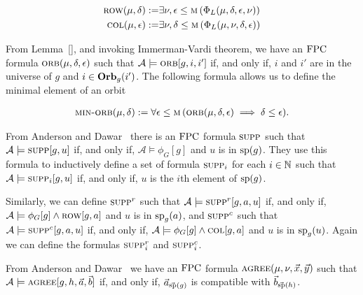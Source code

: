 \documentclass[../paper.tex]{subfiles}
\begin{document}
\begin{align*}
	\textsc{row} (\mu, \delta) :=   & \exists \nu, \epsilon \leq \textsc{m} \, (\Phi_L (\mu, \delta, \epsilon, \nu)) \\
	\textsc{col} (\mu, \epsilon) := & \exists \nu, \delta \leq \textsc{m} \, (\Phi_L (\mu, \nu, \delta , \epsilon))  
\end{align*}

From Lemma~\ref{}, and invoking Immerman-Vardi theorem, we have an $\text{\upshape FPC}$
formula $\textsc{orb}(\mu, \delta, \epsilon)$ such that $\mathcal{A} \models
\textsc{orb}[g,i, i']$ if, and only if, $i$ and $i'$ are in the universe of $g$ and
$i \in \text{\textbf{Orb}}_g(i')$. The following formula allows us to define the minimal
element of an orbit

\begin{align*}
	\textsc{min-orb} (\mu, \delta) := \forall \epsilon \leq \textsc{m} \, (\textsc{orb} (\mu, \delta, \epsilon) \implies \delta \leq \epsilon). 
\end{align*}


From Anderson and Dawar~\cite{AndersonD17} there is an $\text{\upshape FPC}$ formula
$\textsc{supp}$ such that $\mathcal{A} \models \textsc{supp} [g, u]$ if, and only if,
$\mathcal{A} \models \phi_G [g]$ and $u$ is in $\text{sp}(g)$. They use this
formula to inductively define a set of formula $\textsc{supp}_i$ for each $i \in
\mathbb{N}$ such that $\mathcal{A} \models \textsc{supp}_i[g, u]$ if, and only if, $u$ is
the $i$th element of $\text{sp}(g)$.

Similarly, we can define $\textsc{supp}^r$ such that $\mathcal{A} \models
\textsc{supp}^r[g, a, u]$ if, and only if, $\mathcal{A} \models \phi_G [g] \land
\textsc{row}[g, a]$ and $u$ is in $\text{sp}_g(a)$, and $\textsc{supp}^c$ such that
$\mathcal{A} \models \textsc{supp}^c[g, a, u]$ if, and only if, $\mathcal{A} \models
\phi_G [g] \land \textsc{col}[g, a]$ and $u$ is in $\text{sp}_g(u)$. Again we can
define the formulas $\textsc{supp}^r_i$ and $\textsc{supp}^c_i$.

From Anderson and Dawar~\cite{AndersonD17} we have an $\text{\upshape FPC}$ formula $\textsc{agree}(\mu, \nu, \vec{x}, \vec{y})$ such that $\mathcal{A} \models \textsc{agree}[g, h, \vec{a}, \vec{b}]$ if, and only if, $\vec{a}_{\vec{\text{sp}}(g)}$ is compatible with $\vec{b}_{\vec{\text{sp}}(h)}$.  

\end{document}
